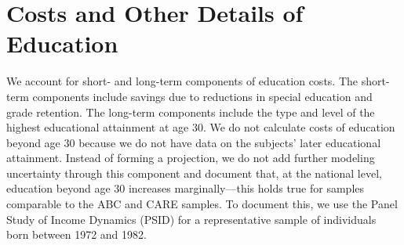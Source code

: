 \section{Costs and Other Details of Education} \label{appendix:education}

\noindent We account for short- and long-term components of education costs. The short-term components include savings due to reductions in special education and grade retention. The long-term components include the type and level of the highest educational attainment at age 30. We do not calculate costs of education beyond age 30 because we do not have data on the subjects' later educational attainment. Instead of forming a projection, we do not add further modeling uncertainty through this component and document that, at the national level, education beyond age 30 increases marginally---this holds true for samples comparable to the ABC and CARE samples. To document this, we use the  Panel Study of Income Dynamics (PSID) for a representative sample of individuals born between 1972 and 1982. \\

